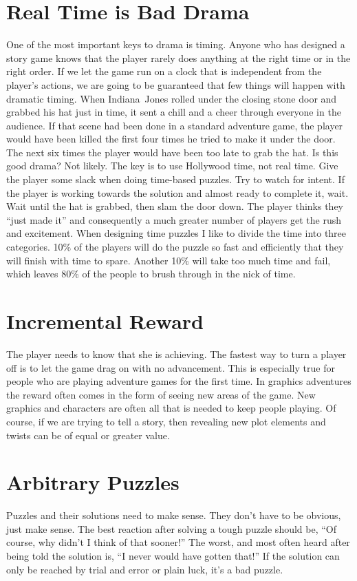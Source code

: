 \documentclass[12pt,letterpaper]{article}
\begin{document}
\section*{Real Time is Bad Drama} One of the most important keys to drama is
timing. Anyone who has designed a story game knows that the player rarely does
anything at the right time or in the right order. If we let the game run on a
clock that is independent from the player's actions, we are going to be
guaranteed that few things will happen with dramatic timing. When Indiana~Jones
rolled under the closing stone door and grabbed his hat just in time, it sent a
chill and a cheer through everyone in the audience. If that scene had been done
in a standard adventure game, the player would have been killed the first four
times he tried to make it under the door. The next six times the player would
have been too late to grab the hat. Is this good drama? Not likely. The key is
to use Hollywood time, not real time. Give the player some slack when doing
time-based puzzles. Try to watch for intent. If the player is working towards
the solution and almost ready to complete it, wait. Wait until the hat is
grabbed, then slam the door down. The player thinks they ``just made it'' and
consequently a much greater number of players get the rush and excitement. When
designing time puzzles I like to divide the time into three categories. 10\% of
the players will do the puzzle so fast and efficiently that they will finish
with time to spare. Another 10\% will take too much time and fail, which leaves
80\% of the people to brush through in the nick of time.

\section*{Incremental Reward} The player needs to know that she is achieving.
The fastest way to turn a player off is to let the game drag on with no
advancement. This is especially true for people who are playing adventure games
for the first time. In graphics adventures the reward often comes in the form
of seeing new areas of the game. New graphics and characters are often all that
is needed to keep people playing. Of course, if we are trying to tell a story,
then revealing new plot elements and twists can be of equal or greater value.

\section*{Arbitrary Puzzles} Puzzles and their solutions need to make sense.
They don't have to be obvious, just make sense. The best reaction after solving
a tough puzzle should be, ``Of course, why didn't I think of that sooner!'' The
worst, and most often heard after being told the solution is, ``I never would
have gotten that!'' If the solution can only be reached by trial and error or
plain luck, it's a bad puzzle.
\end{document}
